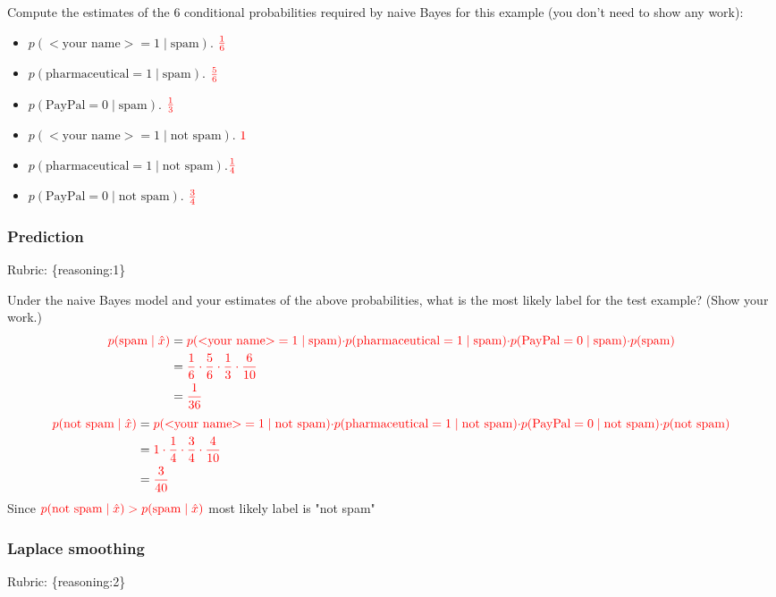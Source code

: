 \documentclass{article}
\def\rubric#1{\gre{Rubric: \{#1\}}}{}
\def\blu#1{{\color{blu}#1}}
\def\gre#1{{\color{gre}#1}}
\def\red#1{{\color{red}#1}}
\def\cond{\; | \;}
\def\items#1{\begin{itemize}#1\end{itemize}}
\begin{document}
\blu{Compute the estimates of the 6 conditional probabilities required by naive Bayes for this example}  (you don't need to show any work):
\items{
\item $p(\text{$<$your name$>$} = 1  \cond \text{spam})$. $\red{\frac{1}{6}}$
\item $p(\text{pharmaceutical} = 1 \cond \text{spam})$. $\red{\frac{5}{6}}$
\item $p(\text{PayPal} = 0  \cond \text{spam})$. $\red{\frac{1}{3}}$
\item $p(\text{$<$your name$>$} = 1  \cond \text{not spam})$. $\red{1}$
\item $p(\text{pharmaceutical} = 1  \cond \text{not spam})$.$\red{\frac{1}{4}}$
\item $p(\text{PayPal} = 0  \cond \text{not spam})$. $\red{\frac{3}{4}}$
}

\subsubsection{Prediction}
\rubric{reasoning:1}

\blu{Under the naive Bayes model and your estimates of the above probabilities, what is the most likely label for the test example? (Show your work.)} \\
\begin{align*}
    \red{p( \text{spam} \cond \hat{x})} &= \red{p(\text{$<$your name$>$} = 1  \cond \text{spam})} \red{\cdot} \red{p(\text{pharmaceutical} = 1 \cond \text{spam})} \red{\cdot} \red{p(\text{PayPal} = 0  \cond \text{spam})} \red{\cdot} \red{p(\text{spam})} \\
    &= \red{\frac{1}{6} \cdot \frac{5}{6} \cdot \frac{1}{3} \cdot \frac{6}{10}} \\
    &= \red{\frac{1}{36}}
\end{align*}
\begin{align*}
    \red{p( \text{not spam} \cond \hat{x})} &= \red{p(\text{$<$your name$>$}=1 \cond \text{not spam})} \red{\cdot} \red{p(\text{pharmaceutical}=1 \cond \text{not spam})} \red{\cdot}  \red{p(\text{PayPal}=0  \cond \text{not spam})} \red{\cdot} \red{p(\text{not spam})} \\
    &= \red{1 \cdot \frac{1}{4} \cdot \frac{3}{4} \cdot \frac{4}{10}} \\
    &= \red{\frac{3}{40}}
\end{align*}
\red{Since} $\red{p( \text{not spam} \cond \hat{x}) > p( \text{spam} \cond \hat{x})}$ \red{most likely label is "not spam"}
\subsubsection{Laplace smoothing}
\label{laplace.conceptual}
\rubric{reasoning:2}
\end{document}
